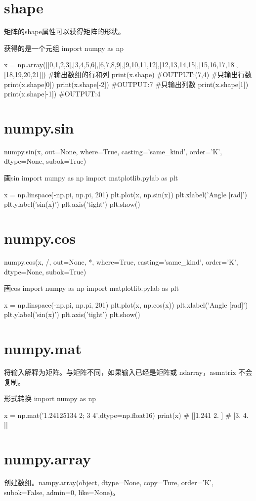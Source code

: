 \documentclass[11pt]{article}
\begin{document}
\section{shape}
矩阵的shape属性可以获得矩阵的形状。
\begin{Python}{获得的是一个元组}
import numpy as np

x = np.array([[0,1,2,3],[3,4,5,6],[6,7,8,9],[9,10,11,12],[12,13,14,15],[15,16,17,18],[18,19,20,21]])
#输出数组的行和列
print(x.shape)      #OUTPUT:(7,4)
#只输出行数
print(x.shape[0])
print(x.shape[-2])  #OUTPUT:7
#只输出列数
print(x.shape[1])
print(x.shape[-1])  #OUTPUT:4
\end{Python}
\section{numpy.sin}
numpy.sin(x, out=None, where=True, casting='same\_kind', order='K', dtype=None, subok=True)
\begin{Python}{画sin}
import numpy as np
import matplotlib.pylab as plt

x = np.linspace(-np.pi, np.pi, 201)
plt.plot(x, np.sin(x))
plt.xlabel('Angle [rad]')
plt.ylabel('sin(x)')
plt.axis('tight')
plt.show()
\end{Python}
\section{numpy.cos}
numpy.cos(x, /, out=None, *, where=True, casting='same\_kind', order='K', dtype=None, subok=True)
\begin{Python}{画cos}
	import numpy as np
	import matplotlib.pylab as plt
	
	x = np.linspace(-np.pi, np.pi, 201)
	plt.plot(x, np.cos(x))
	plt.xlabel('Angle [rad]')
	plt.ylabel('sin(x)')
	plt.axis('tight')
	plt.show()
\end{Python}




\section{numpy.mat}
将输入解释为矩阵。与矩阵不同，如果输入已经是矩阵或 ndarray，asmatrix 不会复制。
\begin{Python}{形式转换}
import numpy as np

x = np.mat('1.24125134 2; 3 4',dtype=np.float16)
print(x)
#   [[1.241 2.   ]
#    [3.    4.   ]]
\end{Python}
\section{numpy.array}
创建数组。nampy.array(object, dtype=None, copy=Ture, order='K', subok=False, admin=0, like=None)。
\end{document}

